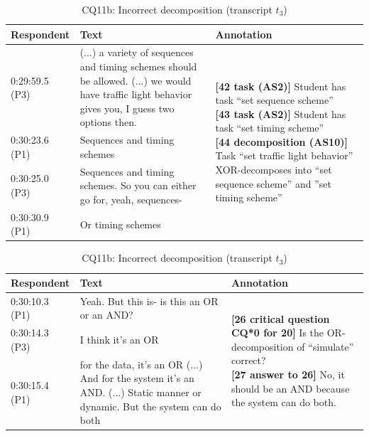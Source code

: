 \documentclass[11.5pt,two column]{llncs}
\begin{document}
\begin{table}[!htbp]
\centering
\begin{tabular}{|p{20mm}|p{70mm}|p{60mm}|}
\hline
Respondent & Text & Annotation\\
\hline
0:29:59.5 (P3) & (...) a variety of sequences and timing schemes should be allowed.  (...) we would have traffic light behavior gives you, I guess two options then. & \multirow{4}{60mm}{\textbf{[42 task (AS2)]} Student has task ``set sequence scheme''\newline
\textbf{[43 task (AS2)]} Student has task ``set timing scheme'' \newline
\textbf{[44 decomposition (AS10)] }Task ``set traffic light behavior'' XOR-decomposes into ``set sequence scheme'' and ''set timing scheme''}\\
\cline{1-2}
0:30:23.6 (P1) & Sequences and timing schemes &\\
\cline{1-2}
0:30:25.0 (P3) & Sequences and timing schemes. So you can either go for, yeah, sequences-&\\
\cline{1-2}
0:30:30.9 (P1) & Or timing schemes&\\
\hline	
\end{tabular}
\caption{AS2: Task, AS10: Task decomposition (transcript $t_2$)}
\label{table:transcript:as2-as10}

\begin{tabular}{|p{20mm}|p{70mm}|p{60mm}|}
\hline
Respondent & Text & Annotation\\
\hline
0:30:10.3 (P1) & 	Yeah. But this is- is this an OR or an AND? & \multirow{3}{60mm}{\textbf{[26 critical question CQ*0 for 20]} Is the OR-decomposition of ``simulate'' correct?\newline
\textbf{[27 answer to 26]} No, it should be an AND because the system can do both.}\\
\cline{1-2}
0:30:14.3 (P3) &I think it's an OR&\\
\cline{1-2}
0:30:15.4 (P1) & for the data, it's an OR (...) And for the system it's an AND. (...) Static manner or dynamic. But the system can do both&\\
\hline	
\end{tabular}
\caption{CQ11b: Incorrect decomposition (transcript $t_3$)}
\label{table:transcript:cq11b}


\end{table}
\end{document}
